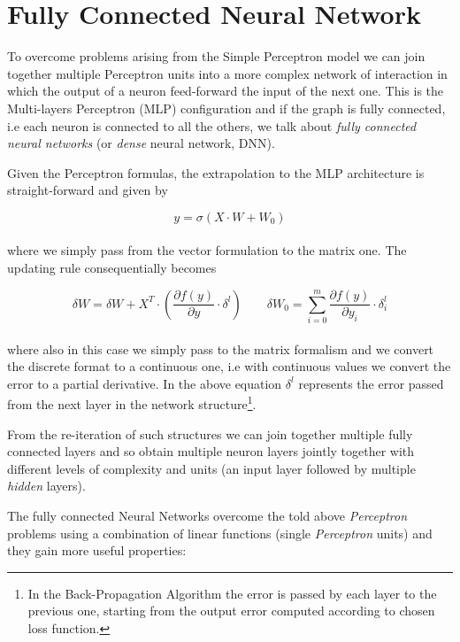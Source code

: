 \documentclass{standalone}
\begin{document}
\section[Fully Connected Neural Network]{Fully Connected Neural Network}\label{NN:connected}

To overcome problems arising from the Simple Perceptron model we can join together multiple Perceptron units into a more complex network of interaction in which the output of a neuron feed-forward the input of the next one.
This is the Multi-layers Perceptron (MLP) configuration and if the graph is fully connected, i.e each neuron is connected to all the others, we talk about \emph{fully connected neural networks} (or \emph{dense} neural network, DNN).

Given the Perceptron formulas, the extrapolation to the MLP architecture is straight-forward and given by

$$
y = \sigma\left(X \cdot W + W_0 \right)
$$
\\
where we simply pass from the vector formulation to the matrix one.
The updating rule consequentially becomes

$$
\delta W = \delta W + X^T \cdot \left( \frac{\partial f(y)}{\partial y} \cdot \delta^l \right)  \quad\quad \delta W_0 = \sum_{i=0}^{m}\frac{\partial f(y)}{\partial y_i} \cdot \delta_i^l
$$
\\
where also in this case we simply pass to the matrix formalism and we convert the discrete format to a continuous one, i.e with continuous values we convert the error to a partial derivative.
In the above equation $\delta^l$ represents the error passed from the next layer in the network structure\footnote{
  In the Back-Propagation Algorithm the error is passed by each layer to the previous one, starting from the output error computed according to chosen loss function.
}.

From the re-iteration of such structures we can join together multiple fully connected layers and so obtain multiple neuron layers jointly together with different levels of complexity and units (an input layer followed by multiple \emph{hidden} layers).

The fully connected Neural Networks overcome the told above \emph{Perceptron} problems using a combination of linear functions (single \emph{Perceptron} units) and they gain more useful properties:
\end{document}
